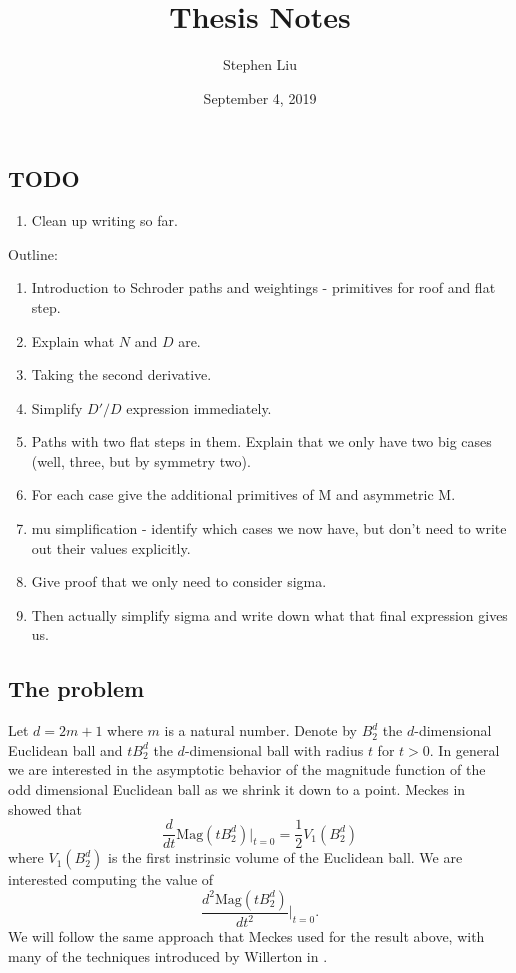 \documentclass[11pt]{article}
\theoremstyle{definition}
\theoremstyle{definition}
\theoremstyle{plain}
\theoremstyle{plain}
\theoremstyle{plain}
\theoremstyle{definition}
\begin{document}
\author{Stephen Liu}
\title{Thesis Notes}
\date{September 4, 2019}

\maketitle

\subsection*{TODO}
\begin{enumerate}
\item Clean up writing so far.
\end{enumerate}

Outline:
\begin{enumerate}[label=(\alph*)]
\item Introduction to Schroder paths and weightings - primitives for roof and flat step.
\item Explain what $N$ and $D$ are.
\item Taking the second derivative.
\item Simplify $D'/D$ expression immediately.
\item Paths with two flat steps in them. Explain that we only have two big cases (well, three, but by symmetry two).
\item For each case give the additional primitives of M and asymmetric M.
\item mu simplification - identify which cases we now have, but don't need to write out their values explicitly.
\item Give proof that we only need to consider sigma.
\item Then actually simplify sigma and write down what that final expression gives us.
\end{enumerate}

\subsection*{The problem}
Let $d = 2m+1$ where $m$ is a natural number. Denote by $B_2^d$ the $d$-dimensional Euclidean ball and $tB_2^d$ the $d$-dimensional ball with radius $t$ for $t > 0$. In general we are interested in the asymptotic behavior of the magnitude function of the odd dimensional Euclidean ball as we shrink it down to a point. Meckes in \cite{meckes_magnitude_2019} showed that
\begin{equation*}
\frac{d}{dt}\text{Mag}(tB_2^d)\big\vert_{t=0} = \frac{1}{2}V_1(B_2^d)
\end{equation*}
where $V_1(B_2^d)$ is the first instrinsic volume of the Euclidean ball.
We are interested computing the value of
\begin{equation*}
\frac{d^2\text{Mag}(tB_2^d)}{dt^2}\big\vert_{t=0}.
\end{equation*}
We will follow the same approach that Meckes used for the result above, with many of the techniques introduced by Willerton in \cite{willerton_magnitude_2017}.
\end{document}
